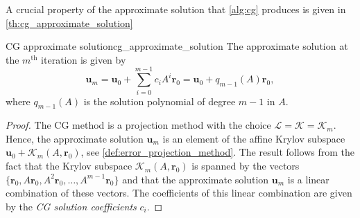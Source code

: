 A crucial property of the approximate solution that \cref{alg:cg} produces is given in \cref{th:cg_approximate_solution}
\begin{fancyth}{CG approximate solution}{cg_approximate_solution}
  The approximate solution at the $m^{\text{th}}$ iteration is given by
  \begin{equation}
    \mathbf{u}_m = \mathbf{u}_0 + \sum_{i=0}^{m-1} c_i A^i \mathbf{r}_0 = \mathbf{u}_0 + q_{m-1}(A)\mathbf{r}_0,
    \label{eq:cg_approximate_solution}
  \end{equation}
  where $q_{m-1}(A)$ is the solution polynomial of degree $m-1$ in $A$.
\end{fancyth}
\begin{proof}
  The CG method is a projection method with the choice $\mathcal{L} = \mathcal{K} = \mathcal{K}_m$. Hence, the approximate solution $\mathbf{u}_m$ is an element of the affine Krylov subspace $\mathbf{u}_0 + \mathcal{K}_m(A, \mathbf{r}_0)$, see \cref{def:error_projection_method}. The result follows from the fact that the Krylov subspace $\mathcal{K}_m(A, \mathbf{r}_0)$ is spanned by the vectors $\{\mathbf{r}_0, A\mathbf{r}_0, A^2\mathbf{r}_0, \dots, A^{m-1}\mathbf{r}_0\}$ and that the approximate solution $\mathbf{u}_m$ is a linear combination of these vectors. The coefficients of this linear combination are given by the \textit{CG solution coefficients} $c_i$.
\end{proof}

